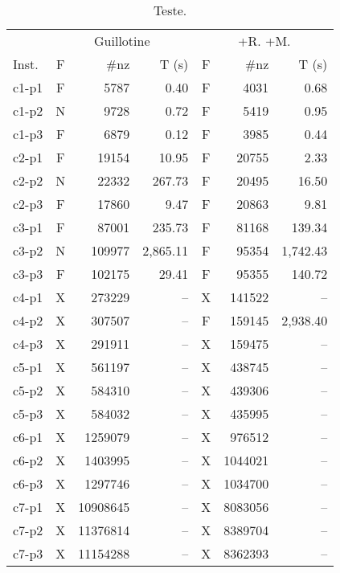 \documentclass[ppgc,tese,english,formais,babel]{iiufrgs}
\begin{document}
\begin{table}[H]
\centering
\caption{Teste.}
\label{tab:hopper_c_joined}
\begin{tabular}{lcrrcrr}
\hline\hline
& \multicolumn{3}{c}{Guillotine} & \multicolumn{3}{c}{+R. +M.} \\\cmidrule(lr){2-4}\cmidrule(lr){5-7}
Inst. & F & \#nz & T (s) & F & \#nz & T (s) \\\hline
c1-p1 & F & 5787 & 0.40 & F & 4031 & 0.68 \\
c1-p2 & N & 9728 & 0.72 & F & 5419 & 0.95 \\
c1-p3 & F & 6879 & 0.12 & F & 3985 & 0.44 \\
c2-p1 & F & 19154 & 10.95 & F & 20755 & 2.33 \\
c2-p2 & N & 22332 & 267.73 & F & 20495 & 16.50 \\
c2-p3 & F & 17860 & 9.47 & F & 20863 & 9.81 \\
c3-p1 & F & 87001 & 235.73 & F & 81168 & 139.34 \\
c3-p2 & N & 109977 & 2,865.11 & F & 95354 & 1,742.43 \\
c3-p3 & F & 102175 & 29.41 & F & 95355 & 140.72 \\
c4-p1 & X & 273229 & -- & X & 141522 & -- \\
c4-p2 & X & 307507 & -- & F & 159145 & 2,938.40 \\
c4-p3 & X & 291911 & -- & X & 159475 & -- \\
c5-p1 & X & 561197 & -- & X & 438745 & -- \\
c5-p2 & X & 584310 & -- & X & 439306 & -- \\
c5-p3 & X & 584032 & -- & X & 435995 & -- \\
c6-p1 & X & 1259079 & -- & X & 976512 & -- \\
c6-p2 & X & 1403995 & -- & X & 1044021 & -- \\
c6-p3 & X & 1297746 & -- & X & 1034700 & -- \\
c7-p1 & X & 10908645 & -- & X & 8083056 & -- \\
c7-p2 & X & 11376814 & -- & X & 8389704 & -- \\
c7-p3 & X & 11154288 & -- & X & 8362393 & -- \\\hline\hline
\end{tabular}
\end{table}

\appendix
\end{document}
